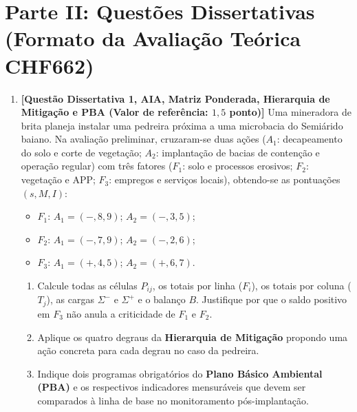 \section*{Parte II: Questões Dissertativas (Formato da Avaliação Teórica CHF662)}

\begin{enumerate}[leftmargin=1.8em, itemsep=6pt, resume]
  \item \textbf{[Questão Dissertativa 1, AIA, Matriz Ponderada, Hierarquia de Mitigação e PBA (Valor de referência: $1{,}5$ ponto)]}
  Uma mineradora de brita planeja instalar uma pedreira próxima a uma microbacia do Semiárido baiano. Na avaliação preliminar, cruzaram-se duas ações ($A_1$: decapeamento do solo e corte de vegetação; $A_2$: implantação de bacias de contenção e operação regular) com três fatores ($F_1$: solo e processos erosivos; $F_2$: vegetação e APP; $F_3$: empregos e serviços locais), obtendo-se as pontuações $(s, M, I)$:
  \begin{itemize}[leftmargin=1.5em, itemsep=1.5pt]
    \item $F_1$: $A_1=(-, 8, 9)$; $A_2=(-, 3, 5)$;
    \item $F_2$: $A_1=(-, 7, 9)$; $A_2=(-, 2, 6)$;
    \item $F_3$: $A_1=(+, 4, 5)$; $A_2=(+, 6, 7)$.
  \end{itemize}
  \begin{enumerate}[label=(\alph*), leftmargin=1.8em, itemsep=2pt]
    \item Calcule todas as células $P_{ij}$, os totais por linha ($F_i$), os totais por coluna ($T_j$), as cargas $\Sigma^{-}$ e $\Sigma^{+}$ e o balanço $B$. Justifique por que o saldo positivo em $F_3$ não anula a criticidade de $F_1$ e $F_2$.
    \item Aplique os quatro degraus da \textbf{Hierarquia de Mitigação} propondo uma ação concreta para cada degrau no caso da pedreira.
    \item Indique dois programas obrigatórios do \textbf{Plano Básico Ambiental (PBA)} e os respectivos indicadores mensuráveis que devem ser comparados à linha de base no monitoramento pós-implantação.
  \end{enumerate}
  \espacoResolucao[4.0cm]


\end{enumerate}
